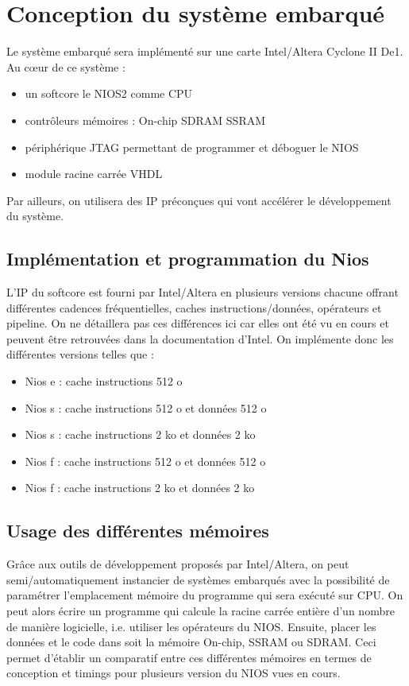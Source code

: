 \documentclass[12pt,a4paper]{article}
\begin{document}
\section{Conception du système embarqué} %
Le système embarqué sera implémenté sur une carte Intel/Altera Cyclone II De1. Au cœur de ce système : 
\begin{itemize}
\item un softcore le NIOS2 comme CPU
\item contrôleurs mémoires :
\subitem On-chip
\subitem SDRAM
\subitem SSRAM
\item périphérique JTAG permettant de programmer et déboguer le NIOS
\item module racine carrée VHDL
\end{itemize}
Par ailleurs, on utilisera des IP préconçues qui vont accélérer le développement du système. 


\subsection{Implémentation et programmation du Nios}
L'IP du softcore est fourni par Intel/Altera en plusieurs versions chacune offrant différentes cadences fréquentielles, caches instructions/données, opérateurs et pipeline. On ne détaillera pas ces différences ici car elles ont été vu en cours et peuvent être retrouvées dans la documentation d'Intel. On implémente donc les différentes versions telles que :
\begin{itemize}
\item Nios e : cache instructions 512 o
\item Nios s : cache instructions 512 o et données 512 o
\item Nios s : cache instructions 2 ko et données 2 ko
\item Nios f : cache instructions 512 o et données 512 o
\item Nios f : cache instructions 2 ko et données 2 ko
\end{itemize}
\subsection{Usage des différentes mémoires}
Grâce aux outils de développement proposés par Intel/Altera, on peut semi/automatiquement instancier de systèmes embarqués avec la possibilité de paramétrer l'emplacement mémoire du programme qui sera exécuté sur CPU. On peut alors écrire un programme qui calcule la racine carrée entière d'un nombre de manière logicielle, i.e. utiliser les opérateurs du NIOS. Ensuite, placer les données et le code dans soit la mémoire On-chip, SSRAM ou SDRAM. Ceci permet d'établir un comparatif entre ces différentes mémoires en termes de conception et timings pour plusieurs version du NIOS vues en cours. 
\end{document}
